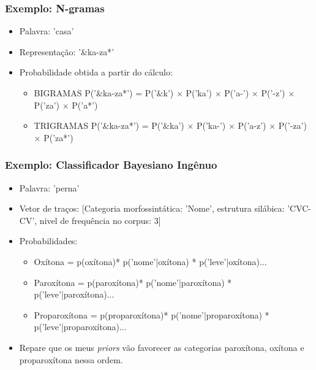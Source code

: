 \documentclass[xcolor=table]{beamer}
\begin{document}
	\begin{frame}
		\frametitle{Exemplo: N-gramas}
		\begin{itemize}
			\item Palavra: 'casa'\\
			\item Representação: '\&ka-za*'\\
			\item Probabilidade obtida a partir do cálculo:\\
			\begin{itemize}
				\item BIGRAMAS P('\&ka-za*') = P('\&k') $\times$ P('ka') $\times$ P('a-') $\times$ P('-z') $\times$ P('za') $\times$ P('a*')\\
				\item TRIGRAMAS P('\&ka-za*') = P('\&ka') $\times$ P('ka-') $\times$ P('a-z') $\times$ P('-za') $\times$ P('za*')\\
			\end{itemize} 

		\end{itemize}
	\end{frame}
	\begin{frame}
		\frametitle{Exemplo: Classificador Bayesiano Ingênuo}
		\begin{itemize}
			\item Palavra: 'perna'\\
			\item Vetor de traços: [Categoria morfossintática: 'Nome', estrutura silábica: 'CVC-CV', nivel de frequência no corpus: 3]\\
			\item Probabilidades:
			\begin{itemize}
				\item Oxítona = p(oxítona)* p('nome'|oxítona) * p('leve'|oxítona)...
				\item Paroxítona = p(paroxítona)* p('nome'|paroxítona) * p('leve'|paroxítona)...
				\item Proparoxítona = p(proparoxítona)* p('nome'|proparoxítona) * p('leve'|proparoxítona)...
			\end{itemize}
			\item Repare que os meus \textit{priors} vão favorecer as categorias paroxítona, oxítona e proparoxítona nessa ordem.\\
			
		\end{itemize}	
	\end{frame}
	
\end{document}
